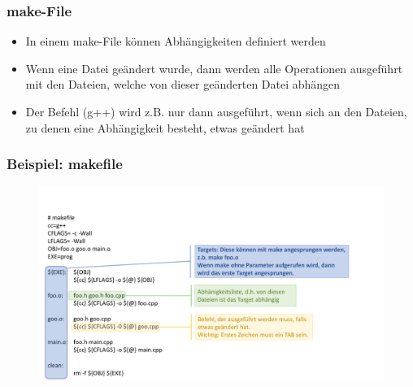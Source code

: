\subsubsection{make-File}
\label{sec:make-File}
\begin{itemize}
	\item In einem make-File können Abhängigkeiten definiert werden
	\item Wenn eine Datei geändert wurde, dann werden alle Operationen ausgeführt mit den Dateien, welche von dieser geänderten Datei abhängen
	\item Der Befehl (g++) wird z.B. nur dann ausgeführt, wenn sich an den Dateien, zu denen eine Abhängigkeit besteht, etwas geändert hat
\end{itemize}

\subsubsection{Beispiel: makefile}
\label{sec:Beispiel: makefile}
\noindent
\begin{figure}[hh]
	\centering
	\includegraphics[width=\linewidth]{images/makefile.pdf}
\end{figure}